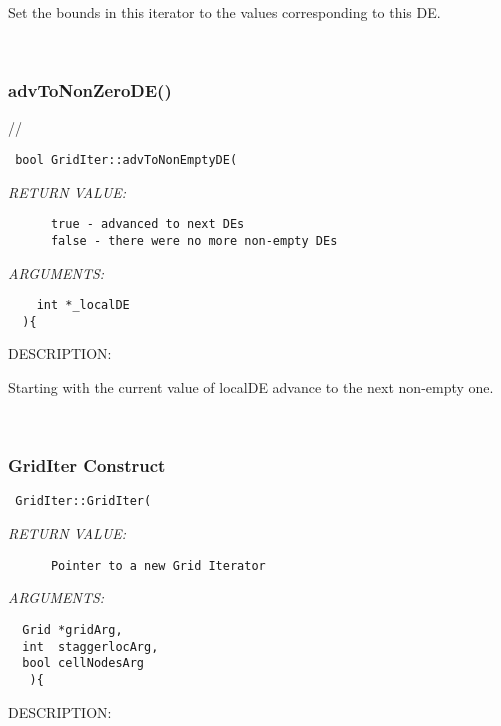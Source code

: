    Set the bounds in this iterator to the values corresponding to
   this DE. 
   
 
\mbox{}\hrulefill\
 
\subsubsection [advToNonZeroDE()] {advToNonZeroDE()}


  //
\begin{verbatim} bool GridIter::advToNonEmptyDE(\end{verbatim}{\em RETURN VALUE:}
\begin{verbatim}      true - advanced to next DEs
      false - there were no more non-empty DEs\end{verbatim}{\em ARGUMENTS:}
\begin{verbatim}    
    int *_localDE
  ){\end{verbatim}
{\sf DESCRIPTION:\\ }


   Starting with the current value of localDE advance to the next non-empty one. 
   
 
\mbox{}\hrulefill\
 
\subsubsection [GridIter] {GridIter Construct}


  
\begin{verbatim} GridIter::GridIter(\end{verbatim}{\em RETURN VALUE:}
\begin{verbatim}      Pointer to a new Grid Iterator\end{verbatim}{\em ARGUMENTS:}
\begin{verbatim}    
  Grid *gridArg,
  int  staggerlocArg,
  bool cellNodesArg
   ){\end{verbatim}
{\sf DESCRIPTION:\\ }


 
   
 
\mbox{}\hrulefill\
 
